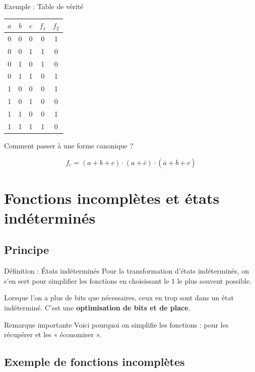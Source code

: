 \documentclass[a4paper,12pt]{article}
\begin{document}
\begin{examplebox}{Exemple : Table de vérité}
\begin{center}
\begin{tabular}{|c|c|c|c|c|}
\hline
$a$ & $b$ & $c$ & $f_1$ & $f_2$ \\
\hline
0 & 0 & 0 & 0 & 1 \\
\hline
0 & 0 & 1 & 1 & 0 \\
\hline
0 & 1 & 0 & 1 & 0 \\
\hline
0 & 1 & 1 & 0 & 1 \\
\hline
1 & 0 & 0 & 0 & 1 \\
\hline
1 & 0 & 1 & 0 & 0 \\
\hline
1 & 1 & 0 & 0 & 1 \\
\hline
1 & 1 & 1 & 1 & 0 \\
\hline
\end{tabular}
\end{center}

\vspace{0.3cm}
Comment passer à une forme canonique ?

\[f_c = (a+b+c) \cdot (a+\overline{c}) \cdot (\overline{a}+\overline{b}+c)\]
\end{examplebox}

\newpage
\section{Fonctions incomplètes et états indéterminés}

\subsection{Principe}

\begin{defbox}{Définition : États indéterminés}
Pour la transformation d'états indéterminés, on s'en sert pour simplifier les fonctions en choisissant le $1$ le plus souvent possible.

Lorsque l'on a plus de bits que nécessaires, ceux en trop sont dans un état indéterminé. C'est une \textbf{optimisation de bits et de place}.
\end{defbox}

\begin{remarkbox}{Remarque importante}
Voici pourquoi on simplifie les fonctions : pour les récupérer et les « économiser ».
\end{remarkbox}

\subsection{Exemple de fonctions incomplètes}
\end{document}
